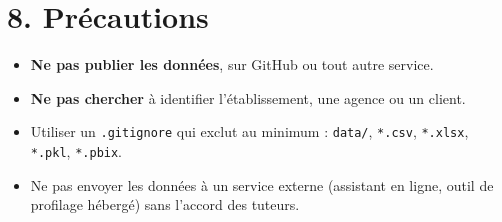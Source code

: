 \documentclass[11pt,a4paper]{article}
\providecommand{\tightlist}{\setlength{\itemsep}{0pt}\setlength{\parskip}{0pt}}
\begin{document}
\section{8. Précautions}\label{pruxe9cautions}

\begin{itemize}
\tightlist
\item
  \textbf{Ne pas publier les données}, sur GitHub ou tout autre service.
\item
  \textbf{Ne pas chercher} à identifier l'établissement, une agence ou
  un client.
\item
  Utiliser un \texttt{.gitignore} qui exclut au minimum :
  \texttt{data/}, \texttt{*.csv}, \texttt{*.xlsx}, \texttt{*.pkl},
  \texttt{*.pbix}.
\item
  Ne pas envoyer les données à un service externe (assistant en ligne,
  outil de profilage hébergé) sans l'accord des tuteurs.
\end{itemize}
\end{document}
